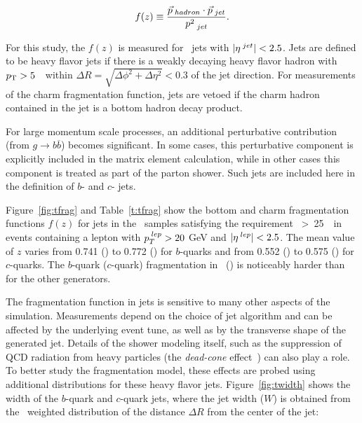 $$
f(z) \equiv \frac{\vec{p}_{\textrm\;hadron} \cdot \vec{p}_{\textrm\;jet} } {{p^2}_{\textrm\;jet}}.
$$
\noindent

For this study, the $f(z)$ is measured for \antiktfour\ jets with $|\eta^{\textrm\;jet}| < 2.5$.  Jets are defined
to be heavy flavor jets if there is a weakly decaying heavy flavor hadron with $p_{\text{T}}>5$\,\GeV\ 
within $\Delta R=\sqrt{\Delta \phi^2 +\Delta \eta^2}<0.3$ of the jet direction.
For measurements of the charm fragmentation function, jets are vetoed if the charm
hadron contained in the jet is a bottom hadron decay product. 

 For large momentum scale processes,
an additional perturbative contribution (from $g\rightarrow b \overline b$) becomes significant. 
In some cases, this perturbative component is explicitly included in
the matrix element calculation, while in other cases this component is treated as part
of the parton shower. Such jets are included here in the definition of $b$- and $c$- jets.

Figure~\ref{fig:tfrag} and Table~\ref{t:tfrag} show the  bottom and  charm fragmentation functions $f(z)$ for  
jets in the \ttbar\ samples satisfying the requirement \ptJet\ \textgreater~25~\GeV\ 
in events containing a lepton with $p_T^{\textrm\;lep} > 20$ GeV and $|\eta^{\textrm\;lep}| < 2.5$. The mean value of $z$ varies from 0.741 (\Herwig) to 0.772 (\Herwigpp) for $b$-quarks
and from 0.552 (\Pythia) to 0.575 (\Herwig) for $c$-quarks.  The $b$-quark ($c$-quark) fragmentation in 
\Herwigpp\ (\Herwig) is noticeably harder than for the other generators.

The fragmentation function in jets is sensitive to many other aspects of the simulation. Measurements
depend on the choice of jet algorithm and can be affected by the underlying event tune, as well as by the
transverse shape of the generated jet.  Details of the shower modeling itself, such as the suppression of 
QCD radiation from heavy particles (the \textit{dead-cone} effect~\cite{Marchesini:1989yk}) can also play a role.
To better study the fragmentation model, these effects are probed using additional distributions
for these heavy flavor jets.  Figure~\ref{fig:twidth} shows the width of the 
$b$-quark and  $c$-quark jets, where the jet width ($W$) is obtained from the \pT\ weighted
distribution of the distance $\Delta R$ from the center of the jet: 

